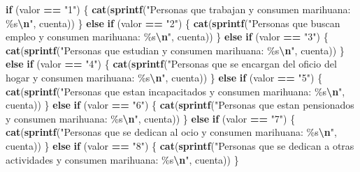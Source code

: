\documentclass[
]{article}
\newenvironment{Shaded}{\begin{snugshade}}{\end{snugshade}}
\newcommand{\ControlFlowTok}[1]{\textcolor[rgb]{0.13,0.29,0.53}{\textbf{#1}}}
\newcommand{\FunctionTok}[1]{\textcolor[rgb]{0.13,0.29,0.53}{\textbf{#1}}}
\newcommand{\NormalTok}[1]{#1}
\newcommand{\SpecialCharTok}[1]{\textcolor[rgb]{0.81,0.36,0.00}{\textbf{#1}}}
\newcommand{\StringTok}[1]{\textcolor[rgb]{0.31,0.60,0.02}{#1}}
\begin{document}
\begin{Shaded}
\begin{Highlighting}[]
  \ControlFlowTok{if}\NormalTok{ (valor }\SpecialCharTok{==} \StringTok{"1"}\NormalTok{) \{}
    \FunctionTok{cat}\NormalTok{(}\FunctionTok{sprintf}\NormalTok{(}\StringTok{"Personas que trabajan y consumen marihuana: \%s}\SpecialCharTok{\textbackslash{}n}\StringTok{"}\NormalTok{, cuenta))}
\NormalTok{  \} }\ControlFlowTok{else} \ControlFlowTok{if}\NormalTok{ (valor }\SpecialCharTok{==} \StringTok{"2"}\NormalTok{) \{}
    \FunctionTok{cat}\NormalTok{(}\FunctionTok{sprintf}\NormalTok{(}\StringTok{"Personas que buscan empleo y consumen marihuana: \%s}\SpecialCharTok{\textbackslash{}n}\StringTok{"}\NormalTok{, cuenta))}
\NormalTok{  \} }\ControlFlowTok{else} \ControlFlowTok{if}\NormalTok{ (valor }\SpecialCharTok{==} \StringTok{"3"}\NormalTok{) \{}
    \FunctionTok{cat}\NormalTok{(}\FunctionTok{sprintf}\NormalTok{(}\StringTok{"Personas que estudian y consumen marihuana: \%s}\SpecialCharTok{\textbackslash{}n}\StringTok{"}\NormalTok{, cuenta))}
\NormalTok{  \} }\ControlFlowTok{else} \ControlFlowTok{if}\NormalTok{ (valor }\SpecialCharTok{==} \StringTok{"4"}\NormalTok{) \{}
    \FunctionTok{cat}\NormalTok{(}\FunctionTok{sprintf}\NormalTok{(}\StringTok{"Personas que se encargan del oficio del hogar y consumen marihuana: \%s}\SpecialCharTok{\textbackslash{}n}\StringTok{"}\NormalTok{, cuenta))}
\NormalTok{  \} }\ControlFlowTok{else} \ControlFlowTok{if}\NormalTok{ (valor }\SpecialCharTok{==} \StringTok{"5"}\NormalTok{) \{}
    \FunctionTok{cat}\NormalTok{(}\FunctionTok{sprintf}\NormalTok{(}\StringTok{"Personas que estan incapacitados y consumen marihuana: \%s}\SpecialCharTok{\textbackslash{}n}\StringTok{"}\NormalTok{, cuenta))}
\NormalTok{  \} }\ControlFlowTok{else} \ControlFlowTok{if}\NormalTok{ (valor }\SpecialCharTok{==} \StringTok{"6"}\NormalTok{) \{}
    \FunctionTok{cat}\NormalTok{(}\FunctionTok{sprintf}\NormalTok{(}\StringTok{"Personas que estan pensionados y consumen marihuana: \%s}\SpecialCharTok{\textbackslash{}n}\StringTok{"}\NormalTok{, cuenta))}
\NormalTok{  \} }\ControlFlowTok{else} \ControlFlowTok{if}\NormalTok{ (valor }\SpecialCharTok{==} \StringTok{"7"}\NormalTok{) \{}
    \FunctionTok{cat}\NormalTok{(}\FunctionTok{sprintf}\NormalTok{(}\StringTok{"Personas que se dedican al ocio y consumen marihuana: \%s}\SpecialCharTok{\textbackslash{}n}\StringTok{"}\NormalTok{, cuenta))}
\NormalTok{  \} }\ControlFlowTok{else} \ControlFlowTok{if}\NormalTok{ (valor }\SpecialCharTok{==} \StringTok{"8"}\NormalTok{) \{}
    \FunctionTok{cat}\NormalTok{(}\FunctionTok{sprintf}\NormalTok{(}\StringTok{"Personas que se dedican a otras actividades y consumen marihuana: \%s}\SpecialCharTok{\textbackslash{}n}\StringTok{"}\NormalTok{, cuenta))}
\NormalTok{  \}}
  

\end{Highlighting}
\end{Shaded}
\end{document}
